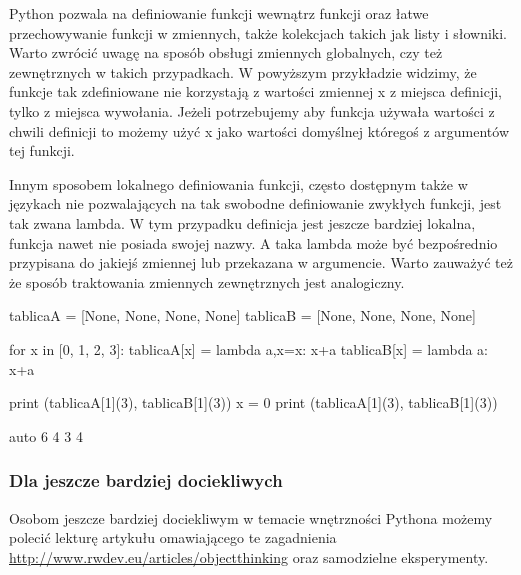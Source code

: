 Python pozwala na definiowanie funkcji wewnątrz funkcji oraz łatwe przechowywanie funkcji w zmiennych, także kolekcjach takich jak listy i słowniki.
Warto zwrócić uwagę na sposób obsługi zmiennych globalnych, czy też zewnętrznych w takich przypadkach.
W powyższym przykładzie widzimy, że funkcje tak zdefiniowane nie korzystają z wartości zmiennej x z miejsca definicji, tylko z miejsca wywołania.
Jeżeli potrzebujemy aby funkcja używała wartości z chwili definicji to możemy użyć x jako wartości domyślnej któregoś z argumentów tej funkcji.

Innym sposobem lokalnego definiowania funkcji, często dostępnym także w językach nie pozwalających na tak swobodne definiowanie zwykłych funkcji, jest tak zwana lambda.
W tym przypadku definicja jest jeszcze bardziej lokalna, funkcja nawet nie posiada swojej nazwy.
A taka lambda może być bezpośrednio przypisana do jakiejś zmiennej lub przekazana w argumencie.
Warto zauważyć też że sposób traktowania zmiennych zewnętrznych jest analogiczny.

\begin{CodeFrame}[python]{0.55\textwidth}
tablicaA = [None, None, None, None]
tablicaB = [None, None, None, None]

for x in [0, 1, 2, 3]:
	tablicaA[x] = lambda a,x=x: x+a
	tablicaB[x] = lambda a: x+a

print (tablicaA[1](3), tablicaB[1](3))
x = 0
print (tablicaA[1](3), tablicaB[1](3))
\end{CodeFrame}
\begin{CodeFrame}{auto}
6 4
3 4
\end{CodeFrame}


\subsubsection{Dla jeszcze bardziej dociekliwych }

Osobom jeszcze bardziej dociekliwym w temacie wnętrzności Pythona możemy polecić lekturę artykułu omawiającego te zagadnienia \url{http://www.rwdev.eu/articles/objectthinking} oraz samodzielne eksperymenty.
